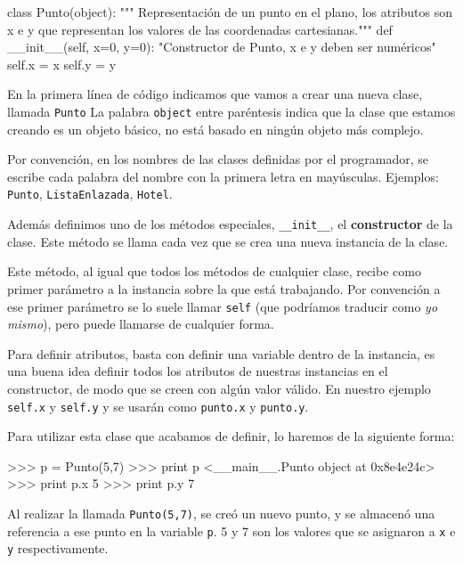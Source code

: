 \begin{codigo-python}
class Punto(object):
    """ Representación de un punto en el plano, los atributos son x e y
        que representan los valores de las coordenadas cartesianas."""
    def __init__(self, x=0, y=0):
        "Constructor de Punto, x e y deben ser numéricos"
        self.x = x
        self.y = y
\end{codigo-python}

En la primera línea de código indicamos que vamos a crear una nueva clase,
llamada \lstinline!Punto!  La palabra \lstinline!object! entre paréntesis
indica que la clase que estamos creando es un objeto básico, no está basado en
ningún objeto más complejo.

\begin{observacion}
Por convención, en los nombres de las clases definidas por el programador, se
escribe cada palabra del nombre con la primera letra en mayúsculas.  Ejemplos:
\lstinline!Punto!, \lstinline!ListaEnlazada!, \lstinline!Hotel!.
\end{observacion}

Además definimos uno de los métodos especiales, \lstinline!__init__!, el
{\bf constructor} de la clase.  Este método se llama cada vez que se crea
una nueva instancia de la clase.

Este método, al igual que todos los métodos de cualquier clase, recibe como
primer parámetro a la instancia sobre la que está trabajando.  Por
convención a ese primer parámetro se lo suele llamar \lstinline!self! (que
podríamos traducir como {\it yo mismo}), pero puede llamarse de cualquier
forma.

Para definir atributos, basta con definir una variable dentro de la
instancia, es una buena idea definir todos los atributos de nuestras
instancias en el constructor, de modo que se creen con algún valor válido.
En nuestro ejemplo \lstinline!self.x! y \lstinline!self.y! y se usarán como
\lstinline!punto.x! y \lstinline!punto.y!.

Para utilizar esta clase que acabamos de definir, lo haremos de la
siguiente forma:

\begin{codigo-python-sn}
>>> p = Punto(5,7)
>>> print p
<__main__.Punto object at 0x8e4e24c>
>>> print p.x
5
>>> print p.y
7
\end{codigo-python-sn}

Al realizar la llamada \lstinline!Punto(5,7)!, se creó un nuevo punto, y se
almacenó una referencia a ese punto en la variable \lstinline!p!. 5 y 7 son
los valores que se asignaron a \lstinline!x! e \lstinline!y!
respectivamente.

